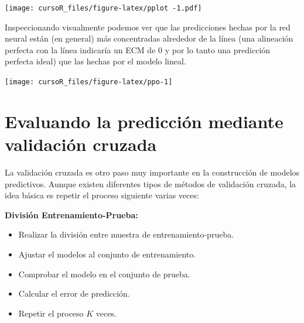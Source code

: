 \documentclass[]{book}
\newenvironment{Shaded}{\begin{snugshade}}{\end{snugshade}}
\newcommand{\KeywordTok}[1]{\textcolor[rgb]{0.13,0.29,0.53}{\textbf{#1}}}
\newcommand{\DataTypeTok}[1]{\textcolor[rgb]{0.13,0.29,0.53}{#1}}
\newcommand{\DecValTok}[1]{\textcolor[rgb]{0.00,0.00,0.81}{#1}}
\newcommand{\FloatTok}[1]{\textcolor[rgb]{0.00,0.00,0.81}{#1}}
\newcommand{\StringTok}[1]{\textcolor[rgb]{0.31,0.60,0.02}{#1}}
\newcommand{\OperatorTok}[1]{\textcolor[rgb]{0.81,0.36,0.00}{\textbf{#1}}}
\newcommand{\NormalTok}[1]{#1}
\providecommand{\tightlist}{%
  \setlength{\itemsep}{0pt}\setlength{\parskip}{0pt}}
\begin{document}
\texttt{[image: cursoR\_files/figure-latex/pplot -1.pdf]}

Inspeccionando visualmente podemos ver que las predicciones hechas por
la red neural están (en general) más concentradas alrededor de la línea
(una alineación perfecta con la línea indicaría un ECM de 0 y por lo
tanto una predicción perfecta ideal) que las hechas por el modelo
lineal.

\begin{Shaded}
\end{Shaded}

\begin{center}\texttt{[image: cursoR\_files/figure-latex/ppo-1]} \end{center}

\section{Evaluando la predicción mediante validación
cruzada}\label{evaluando-la-predicciuxf3n-mediante-validaciuxf3n-cruzada}

La validación cruzada es otro paso muy importante en la construcción de
modelos predictivos. Aunque existen diferentes tipos de métodos de
validación cruzada, la idea básica es repetir el proceso siguiente
varias veces:

\textbf{División Entrenamiento-Prueba:}

\begin{itemize}
\tightlist
\item
  Realizar la división entre muestra de entrenamiento-prueba.
\item
  Ajustar el modelos al conjunto de entrenamiento.
\item
  Comprobar el modelo en el conjunto de prueba.
\item
  Calcular el error de predicción.
\item
  Repetir el proceso \(K\) veces.
\end{itemize}
\end{document}
